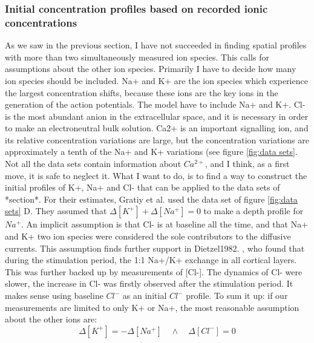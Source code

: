 \documentclass{article}
\begin{document}
\subsubsection{Initial concentration profiles based on recorded ionic concentrations}
As we saw in the previous section, I have not succeeded in finding spatial profiles with more than two simultaneously measured ion species. This calls for assumptions about the other ion species. Primarily I have to decide how many ion species should be included. Na+ and K+ are the ion species which experience the largest concentration shifts, because these ions are the key ions in the generation of the action potentials. The model have to include Na+ and K+. Cl- is the most abundant anion in the extracellular space, and it is necessary in order to make an electroneutral bulk solution. Ca2+ is an important signalling ion, and its relative concentration variations are large, but the concentration variations are approximately a tenth of the Na+ and K+ variations (see figure \ref{fig:data sets}. Not all the data sets contain information about $Ca^{2+}$, and I think, as a first move, it is safe to neglect it. What I want to do, is to find a way to construct the initial profiles of K+, Na+ and Cl- that can be applied to the data sets of *section*. For their estimates, Gratiy et al. used the data set of figure \ref{fig:data sets} D. They assumed that $\Delta [K^+] + \Delta [Na^+] = 0$ to make a depth profile for $Na^+$. An implicit assumption is that Cl- is at baseline all the time, and that Na+ and K+ two ion species were considered the sole contributors to the diffusive currents. This assumption finds further support in Dietzel1982. , who found that during the stimulation period, the 1:1 Na+/K+ exchange in all cortical layers. This was further backed up by measurements of [Cl-]. The dynamics of Cl- were slower, the increase in Cl- was firstly observed after the stimulation period. It makes sense using baseline $Cl^-$ as an initial $Cl^-$ profile. 
To sum it up: if our measurements are limited to only K+ or Na+, the most reasonable assumption about the other ions are:
 $$\Delta [K^+] =  -\Delta [Na^+] \quad \land \quad \Delta [Cl^-] =0$$ 
\end{document}
